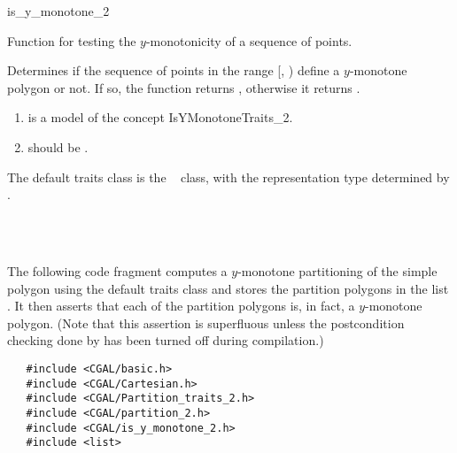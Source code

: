 \begin{ccRefFunction}{is_y_monotone_2}

\ccDefinition

Function for testing the $y$-monotonicity of a sequence of points.


{
Determines if the sequence of points in the range 
[, ) define a $y$-monotone 
polygon or not. If so, the function returns , otherwise it
returns . 
}

\begin{enumerate}
    \item {} is a model of the concept IsYMonotoneTraits\_2.%
    \item {} should be .
\end{enumerate}

The default traits class  is the \cgal\ 
class, 
with the representation type determined by .

\ccSeeAlso
{} \\
 \\

\ccExample

The following code fragment computes a $y$-monotone partitioning
of the simple polygon  using the default
traits class and stores the partition polygons in the list 
.  It then asserts that each of the partition 
polygons is, in fact, a $y$-monotone polygon.  (Note that this
assertion is superfluous unless the postcondition checking done
by  has been turned off during compilation.)

\begin{verbatim}
   #include <CGAL/basic.h>
   #include <CGAL/Cartesian.h>
   #include <CGAL/Partition_traits_2.h>
   #include <CGAL/partition_2.h>
   #include <CGAL/is_y_monotone_2.h>
   #include <list>


\end{verbatim}
\end{ccRefFunction}
